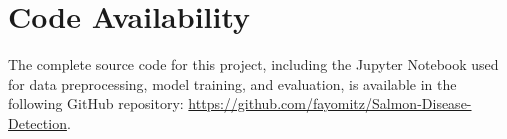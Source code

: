 \documentclass[12pt,a4paper]{article}
\begin{document}
\section*{Code Availability}
The complete source code for this project, including the Jupyter Notebook used for data preprocessing, model training, and evaluation, is available in the following GitHub repository: \url{https://github.com/fayomitz/Salmon-Disease-Detection}.



\end{document}
